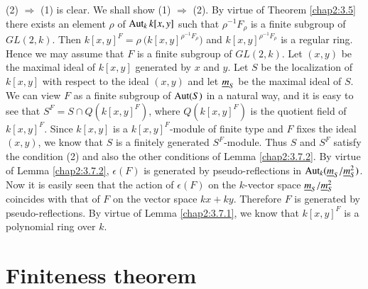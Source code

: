 \subsubsection{}\label{chap2:3.7.3}
\begin{proofofprop*}[3.7 ]
  (2) $\Rightarrow$ (1) is clear. We shall show (1) $\Rightarrow$
  (2). By virtue of Theorem \ref{chap2:3.5} there exists an element
  $\rho$ of $\operatorname{Aut}_{k}k[x,y]$ such that $\rho^{-1}F_{\rho}$ is a finite
  subgroup of $GL(2,k)$. Then
  $k[x,y]^{F}=\rho~(k$\break  $[x,y]^{\rho^{-1}F_{\rho}})$ and
  $k[x,y]^{\rho^{-1}F_{\rho}}$ is a regular ring. Hence we may assume
  that $F$ is a finite subgroup of $GL(2,k)$. Let $(x,y)$ be the
  maximal ideal of $k[x,y]$ generated by $x$ and $y$. Let $S$ be the
  localization of $k[x,y]$ with respect to the ideal $(x,y)$ and let
  $\underline{m}_{S}$ be the maximal ideal of $S$. We can view $F$ as a
  finite subgroup of $\operatorname{Aut}(S)$ in a natural way, and it is easy to see
  that $S^{F}=S\cap Q(k[x,y]^{F})$, where $Q(k[x,y]^{F})$ is the
  quotient field of $k[x,y]^{F}$. Since $k[x,y]$ is a
  $k[x,y]^{F}$-module of finite type and $F$ fixes the ideal $(x,y)$,
  we know that $S$ is a finitely generated $S^{F}$-module. Thus $S$
  and $S^{F}$ satisfy the condition (2) and also the other conditions
  of Lemma \ref{chap2:3.7.2}. By virtue of Lemma \ref{chap2:3.7.2},
  $\epsilon(F)$ is generated by pseudo-reflections in
  $\operatorname{Aut}_{k}(\underline{m}_{S}/\underline{m}^{2}_{S})$. Now it is easily seen that
  the action of $\epsilon(F)$ on the $k$-vector space
  $\underline{m}_{S}/\underline{m}^{2}_{S}$ coincides with that of $F$ on the vector
  space $kx+ky$. Therefore $F$ is generated by pseudo-reflections. By
  virtue of Lemma \ref{chap2:3.7.1}, we know that $k[x,y]^{F}$ is a
  polynomial ring over $k$.  
\end{proofofprop*}

\section{Finiteness theorem}\label{chap2:sec4}\pageoriginale\

